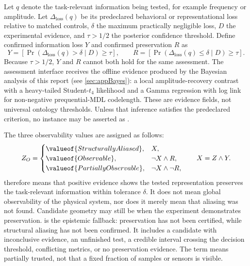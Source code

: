 Let $q$ denote the task-relevant information being tested, for example frequency or amplitude. Let $\Delta_{\mathrm{loss}}(q)$ be its predeclared behavioral or representational loss relative to matched controls, $\delta$ the maximum practically negligible loss, $D$ the experimental evidence, and $\tau>1/2$ the posterior confidence threshold. Define confirmed information loss $Y$ and confirmed preservation $R$ as
\begin{equation}
Y=\left[\Pr\!\left(\Delta_{\mathrm{loss}}(q)>\delta\mid D\right)\geq\tau\right],
\qquad
R=\left[\Pr\!\left(\Delta_{\mathrm{loss}}(q)\leq\delta\mid D\right)\geq\tau\right].
\label{eq:bayesian-evidence}
\end{equation}
Because $\tau>1/2$, $Y$ and $R$ cannot both hold for the same assessment. The assessment interface receives the offline evidence produced by the Bayesian analysis of this report (see \autoref{sec:appBayes}): a local amplitude-recovery contrast with a heavy-tailed Student-$t_4$ likelihood and a Gamma regression with log link for non-negative prequential-MDL codelength. These are evidence fields, not universal ontology thresholds. Unless that inference satisfies the predeclared criterion, no instance may be asserted as .

The three observability values are assigned as follows:
\begin{equation*}
Z_O=
\begin{cases}
\valueof{StructurallyAliased}, & X,\\
\valueof{Observable}, & \neg X\wedge R,\\
\valueof{PartiallyObservable}, & \neg X\wedge\neg R,
\end{cases}
\qquad X=Z\wedge Y.
\end{equation*}
 therefore means that positive evidence shows the tested representation preserves the task-relevant information within tolerance $\delta$. It does not mean global observability of the physical system, nor does it merely mean that aliasing was not found. Candidate geometry may still be  when the experiment demonstrates preservation.  is the epistemic fallback: preservation has not been certified, while structural aliasing has not been confirmed. It includes a candidate with inconclusive evidence, an unfinished test, a credible interval crossing the decision threshold, conflicting metrics, or no preservation evidence. The term means partially trusted, not that a fixed fraction of samples or sensors is visible.

